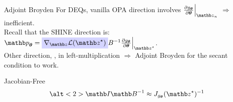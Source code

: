 \begin{frame}{Adjoint Broyden}
    For DEQs, vanilla OPA direction involves $\frac{\partial g_{\thetab}}{\partial \thetab}\Bigr|_{\zb_n}$ $\Rightarrow$ inefficient.\\

    Recall that the SHINE direction is: $\pb_\thetab =  \highlight{blue}{$\nabla_\zb \mathcal{L}(\zb^\star)$} B^{-1} \frac{\partial g_{\thetab}}{\partial \thetab}\Bigr|_{\zb^\star}$.\\
    Other direction, , in left-multiplication $\Rightarrow$ Adjoint Broyden for the secant condition to work.
\end{frame}

\begin{frame}{Jacobian-Free}
    \begin{equation*}
        \alt<2>{\Ib}{\Bb^{-1}} \approx J_{g_{\thetab}}(\zb^\star)^{-1}
    \end{equation*}
\end{frame}